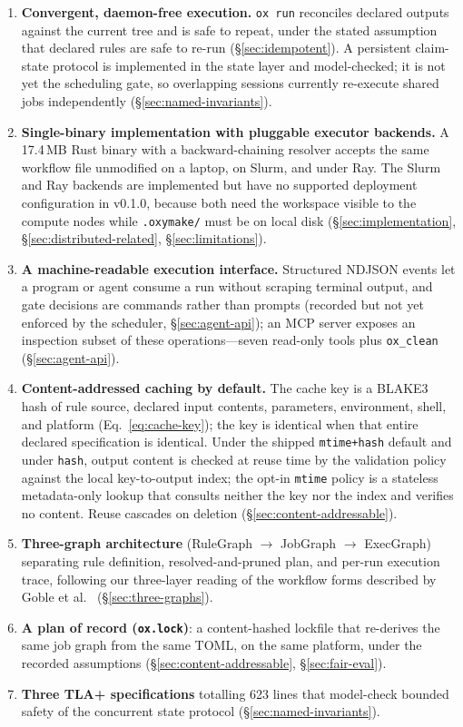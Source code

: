 \documentclass[12pt,a4paper]{article}
\newcommand{\code}[1]{{\texttt{\small\color{inlinecode}#1}}}
\begin{document}
\begin{enumerate}
\item \textbf{Convergent, daemon-free execution.} \code{ox run}
  reconciles declared outputs against the current tree and is safe to
  repeat, under the stated assumption that declared rules are safe to
  re-run (\S\ref{sec:idempotent}). A persistent claim-state protocol
  is implemented in the state layer and model-checked; it is not yet
  the scheduling gate, so overlapping sessions currently re-execute
  shared jobs independently (\S\ref{sec:named-invariants}).
\item \textbf{Single-binary implementation with pluggable executor
  backends.} A
  17.4\,MB Rust binary with a backward-chaining resolver accepts the
  same workflow file unmodified on a laptop, on Slurm, and under Ray.
  The Slurm and Ray backends are implemented but have no supported
  deployment configuration in v0.1.0, because both need the workspace
  visible to the compute nodes while \code{.oxymake/} must be on local
  disk (\S\ref{sec:implementation},
  \S\ref{sec:distributed-related}, \S\ref{sec:limitations}).
\item \textbf{A machine-readable execution interface.} Structured
  NDJSON events let a program or agent consume a run without scraping
  terminal output, and gate decisions are commands rather than prompts
  (recorded but not yet enforced by the scheduler, \S\ref{sec:agent-api}); an MCP
  server exposes an inspection subset of these operations---seven
  read-only tools plus \code{ox\_clean}
  (\S\ref{sec:agent-api}).
\item \textbf{Content-addressed caching by default.} The cache key is a
  BLAKE3 hash of rule source, declared input contents, parameters,
  environment, shell, and platform (Eq.~\ref{eq:cache-key}); the key is
  identical when that entire declared specification is identical.
  Under the shipped \code{mtime+hash} default and under \code{hash},
  output content is checked at reuse time by the validation policy
  against the local key-to-output index; the opt-in \code{mtime} policy
  is a stateless metadata-only lookup that consults neither the key nor
  the index and verifies no content.  Reuse cascades on deletion
  (\S\ref{sec:content-addressable}).
\item \textbf{Three-graph architecture} (RuleGraph $\to$ JobGraph
  $\to$ ExecGraph) separating rule definition, resolved-and-pruned
  plan, and per-run execution trace, following our three-layer reading
  of the workflow forms described by Goble et
  al.~\cite{gobleFAIRComputationalWorkflows2020}
  (\S\ref{sec:three-graphs}).
\item \textbf{A plan of record (\code{ox.lock})}: a content-hashed
  lockfile that re-derives the same job graph from the same TOML, on
  the same platform, under the recorded assumptions
  (\S\ref{sec:content-addressable}, \S\ref{sec:fair-eval}).
\item \textbf{Three TLA+ specifications} totalling 623 lines that
  model-check bounded safety of the concurrent state protocol
  (\S\ref{sec:named-invariants}).
\end{enumerate}
\end{document}
